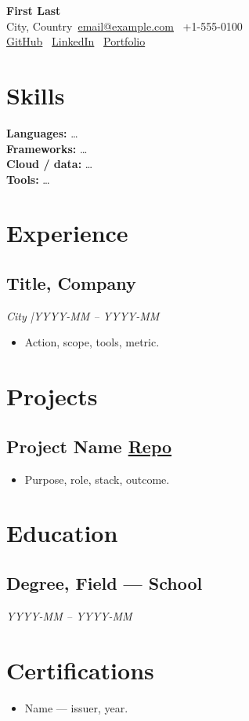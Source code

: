 \documentclass[10pt,letterpaper]{article}
\makeatletter
\newcommand{\Name}{First Last}
\newcommand{\Email}{email@example.com}
\newcommand{\Phone}{+1-555-0100}
\newcommand{\Location}{City, Country}
\newcommand{\LinkedIn}{https://linkedin.com/in/username}
\newcommand{\GitHub}{https://github.com/username}
\newcommand{\Portfolio}{https://example.com}
\makeatother
\begin{document}
{\LARGE\bfseries \Name}\\[0.25em]
\Location \quad \textbar\ \quad \href{mailto:\Email}{\Email} \quad \textbar\ \quad \Phone\\[0.15em]
\href{\GitHub}{GitHub} \quad \textbar\ \quad \href{\LinkedIn}{LinkedIn} \quad \textbar\ \quad \href{\Portfolio}{Portfolio}

\section{Skills}
\textbf{Languages:} \ldots\\
\textbf{Frameworks:} \ldots\\
\textbf{Cloud / data:} \ldots\\
\textbf{Tools:} \ldots

\section{Experience}
\subsection{Title, Company}
\textit{City \quad|\quad YYYY-MM -- YYYY-MM}
\begin{itemize}
  \item Action, scope, tools, metric.
\end{itemize}

\section{Projects}
\subsection{Project Name \quad \href{https://github.com/org/repo}{Repo}}
\begin{itemize}
  \item Purpose, role, stack, outcome.
\end{itemize}

\section{Education}
\subsection{Degree, Field --- School}
\textit{YYYY-MM -- YYYY-MM}

\section{Certifications}
\begin{itemize}
  \item Name --- issuer, year.
\end{itemize}
\end{document}
